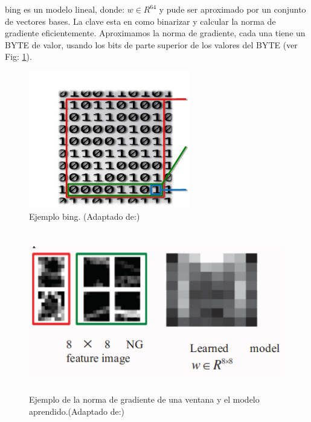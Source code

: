 \ac{bing}  es un modelo lineal, donde:  \(w \in R^{64} \)  y pude ser aproximado por un conjunto de vectores bases. La clave esta en como binarizar y calcular la norma de gradiente eficientemente. Aproximamos la norma de gradiente, cada una tiene un BYTE de valor, usando los bits de parte superior de los valores del BYTE (ver Fig: \ref{Fig: bing}).
\begin{figure}[H]
 \centering
  \includegraphics[height=6cm,keepaspectratio=true,clip=true]{imagenes/Logos/BING.png}
  \caption{Ejemplo \ac{bing}. (Adaptado de:\citep{bing})}
	\label{Fig: bing}
\end{figure}


\begin{figure}[H]
 \centering
  \includegraphics[height=7cm,keepaspectratio=true,clip=true]{imagenes/Logos/bing2.png}
  \caption{Ejemplo de la norma de gradiente de una ventana y el modelo aprendido.(Adaptado de:\citep{bing2})}
	\label{Fig: bing2}
\end{figure}


